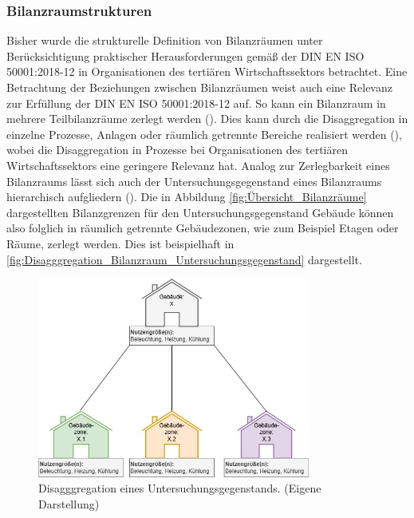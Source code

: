 \subsubsection{Bilanzraumstrukturen}
Bisher wurde die strukturelle Definition von Bilanzräumen unter Berücksichtigung praktischer Herausforderungen gemäß der DIN EN ISO 50001:2018-12 in Organisationen 
des tertiären Wirtschaftssektors betrachtet. Eine Betrachtung der Beziehungen zwischen Bilanzräumen weist auch eine Relevanz zur Erfüllung der DIN EN ISO 50001:2018-12 auf.
So kann ein Bilanzraum in mehrere Teilbilanzräume zerlegt werden (\cite[S. 310]{Engelmann.2015}). Dies kann durch die Disaggregation in einzelne Prozesse, 
Anlagen oder räumlich getrennte Bereiche realisiert werden (\cite[S. 310]{Engelmann.2015}), wobei die Disaggregation in Prozesse bei Organisationen des tertiären 
Wirtschaftssektors eine geringere Relevanz hat.
Analog zur Zerlegbarkeit eines Bilanzraums lässt sich auch der Untersuchungsgegenstand eines Bilanzraums hierarchisch aufgliedern (\cite[S. 109]{Miller.2016}).
Die in Abbildung \eqref{fig:Übersicht_Bilanzräume} dargestellten Bilanzgrenzen für den Untersuchungsgegenstand Gebäude können also folglich in räumlich getrennte 
Gebäudezonen, wie zum Beispiel Etagen oder Räume, zerlegt werden. Dies ist beispielhaft in \eqref{fig:Disagggregation_Bilanzraum_Untersuchungsgegenstand} dargestellt.

\begin{figure}[H]
    \centering
    \includegraphics[width=0.8\textwidth]{../../Ressourcen/Abbildungen/Untersuchungsgegenstand_Zerlegt.jpg}
    \caption{Disagggregation eines Untersuchungsgegenstands. (Eigene Darstellung)}
    \label{fig:Disagggregation_Bilanzraum_Untersuchungsgegenstand}
\end{figure}

